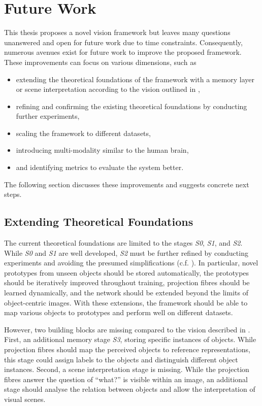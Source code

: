 \section{Future Work}
This thesis proposes a novel vision framework but leaves many questions unanswered and open for future work due to time constraints.
Consequently, numerous avenues exist for future work to improve the proposed framework.
These improvements can focus on various dimensions, such as
\begin{itemize}
    \item extending the theoretical foundations of the framework with a memory layer or scene interpretation according to the vision outlined in ,
    \item refining and confirming the existing theoretical foundations by conducting further experiments,
    \item scaling the framework to different datasets,
    \item introducing multi-modality similar to the human brain,
    \item and identifying metrics to evaluate the system better.
\end{itemize}

The following section discusses these improvements and suggests concrete next steps.

\subsection{Extending Theoretical Foundations}
The current theoretical foundations are limited to the stages \emph{S0}, \emph{S1}, and \emph{S2}.
While \emph{S0} and \emph{S1} are well developed, \emph{S2} must be further refined by conducting experiments and avoiding the presumed simplifications (c.f. ).
In particular, novel prototypes from unseen objects should be stored automatically, the prototypes should be iteratively improved throughout training, projection fibres should be learned dynamically, and the network should be extended beyond the limits of object-centric images.
With these extensions, the framework should be able to map various objects to prototypes and perform well on different datasets.

However, two building blocks are missing compared to the vision described in . First, an additional memory stage \emph{S3}, storing specific instances of objects. While projection fibres should map the perceived objects to reference representations, this stage could assign labels to the objects and distinguish different object instances.
Second, a scene interpretation stage is missing. While the projection fibres answer the question of ``what?'' is visible within an image, an additional stage should analyse the relation between objects and allow the interpretation of visual scenes.


